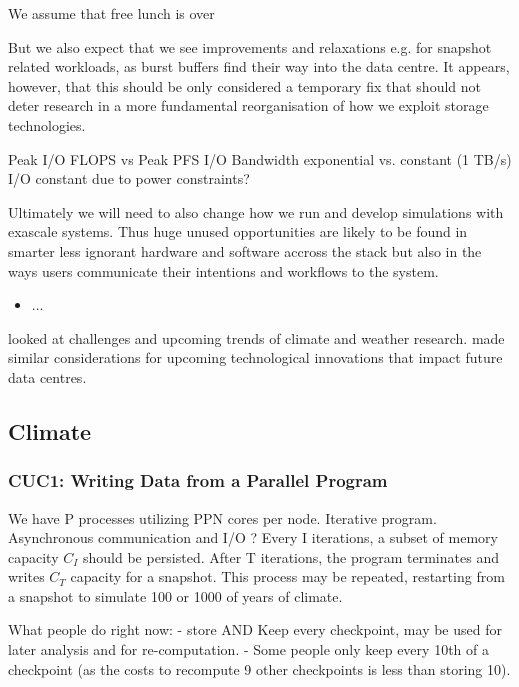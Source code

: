 {We assume that free lunch is over

But we also expect that we see improvements and relaxations e.g. for snapshot related workloads, as burst buffers find their way into the data centre.
It appears, however, that this should be only considered a temporary fix that should not deter research in a more fundamental reorganisation of how we exploit storage technologies.


	Peak I/O FLOPS vs Peak PFS I/O Bandwidth
		exponential vs. constant (1 TB/s)
			I/O constant due to power constraints?



Ultimately we will need to also change how we run and develop simulations with exascale systems.
Thus huge unused opportunities are likely to be found in smarter less ignorant hardware and software accross the stack but also in the ways users communicate their intentions and workflows to the system.



\begin{itemize}
\item ...
\end{itemize}


 looked at challenges and upcoming trends of climate and weather research.
 made similar considerations for upcoming technological innovations that impact future data centres.



\newpage
\subsection{Climate}


\subsubsection{CUC1: Writing Data from a Parallel Program}

We have P processes utilizing PPN cores per node.
Iterative program.
Asynchronous communication and I/O ?
Every I iterations, a subset of memory capacity $C_I$ should be persisted.
After T iterations, the program terminates and writes $C_T$ capacity for a snapshot.
This process may be repeated, restarting from a snapshot to simulate 100 or 1000 of years of climate.

What people do right now:
- store AND Keep every checkpoint, may be used for later analysis and for re-computation.
- Some people only keep every 10th of a checkpoint (as the costs to recompute 9 other checkpoints is less than storing 10).


}
